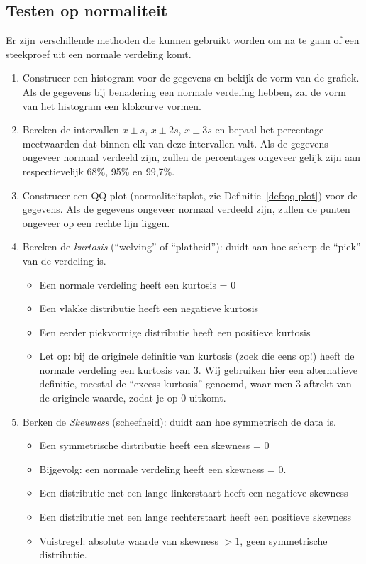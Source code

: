 {\subsection{Testen op normaliteit}

Er zijn verschillende methoden die kunnen gebruikt worden om na te gaan of een steekproef uit een normale verdeling komt.
\begin{enumerate}
  \item Construeer een histogram voor de gegevens en bekijk de vorm van de grafiek. Als de gegevens bij benadering een normale verdeling hebben, zal de vorm van het histogram een klokcurve vormen.
  \item Bereken de intervallen $\overline{x} \pm s$, $\overline{x} \pm 2s$, $\overline{x} \pm 3s$ en bepaal het percentage meetwaarden dat binnen elk van deze intervallen valt. Als de gegevens ongeveer normaal verdeeld zijn, zullen de percentages ongeveer gelijk zijn aan respectievelijk 68\%, 95\% en 99,7\%.
  \item Construeer een QQ-plot (normaliteitsplot, zie Definitie~\ref{def:qq-plot}) voor de gegevens. Als de gegevens ongeveer normaal verdeeld zijn, zullen de punten ongeveer op een rechte lijn liggen.
  \item Bereken de \emph{kurtosis} (``welving'' of ``platheid''): duidt aan hoe scherp de ``piek'' van de verdeling is.
    \begin{itemize}
      \item Een normale verdeling heeft een kurtosis = 0
      \item Een vlakke distributie heeft een negatieve kurtosis
      \item Een eerder piekvormige distributie heeft een positieve kurtosis
      \item Let op: bij de originele definitie van kurtosis (zoek die eens op!) heeft de normale verdeling een kurtosis van 3. Wij gebruiken hier een alternatieve definitie, meestal de ``excess kurtosis'' genoemd, waar men 3 aftrekt van de originele waarde, zodat je op 0 uitkomt.
    \end{itemize}
  \item Berken de \emph{Skewness} (scheefheid): duidt aan hoe symmetrisch de data is.
    \begin{itemize}
      \item Een symmetrische distributie heeft een skewness = 0
      \item Bijgevolg: een normale verdeling heeft een skewness = 0.
      \item Een distributie met een lange linkerstaart heeft een negatieve skewness
      \item Een distributie met een lange rechterstaart heeft een positieve skewness
      \item Vuistregel: absolute waarde van skewness $>1$, geen symmetrische distributie.
    \end{itemize}
\end{enumerate}

}
